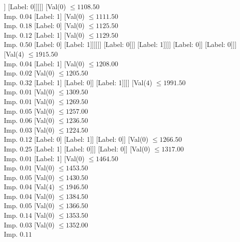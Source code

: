 \documentclass[margin=10pt]{standalone}
\begin{document}
\begin{forest}
																				[Label: 0]
																				[Label: 1]]
																			[Label: 0]]]]]
															[Val($0$) $ \leq 1108.50$ \\ Imp. $0.04$
																[Label: 1]
																[Val($0$) $ \leq 1111.50$ \\ Imp. $0.18$
																	[Label: 0]
																	[Val($0$) $ \leq 1125.50$ \\ Imp. $0.12$
																		[Label: 1]
																		[Val($0$) $ \leq 1129.50$ \\ Imp. $0.50$
																			[Label: 0]
																			[Label: 1]]]]]]
														[Label: 0]]]
												[Label: 1]]]]
									[Label: 0]]
								[Label: 0]]]
						[Val($4$) $ \leq 1915.50$ \\ Imp. $0.04$
							[Label: 1]
							[Val($0$) $ \leq 1208.00$ \\ Imp. $0.02$
								[Val($0$) $ \leq 1205.50$ \\ Imp. $0.32$
									[Label: 1]
									[Label: 0]]
								[Label: 1]]]]
					[Val($4$) $ \leq 1991.50$ \\ Imp. $0.01$
						[Val($0$) $ \leq 1309.50$ \\ Imp. $0.01$
							[Val($0$) $ \leq 1269.50$ \\ Imp. $0.05$
								[Val($0$) $ \leq 1257.00$ \\ Imp. $0.06$
									[Val($0$) $ \leq 1236.50$ \\ Imp. $0.03$
										[Val($0$) $ \leq 1224.50$ \\ Imp. $0.12$
											[Label: 0]
											[Label: 1]]
										[Label: 0]]
									[Val($0$) $ \leq 1266.50$ \\ Imp. $0.25$
										[Label: 1]
										[Label: 0]]]
								[Label: 0]]
							[Val($0$) $ \leq 1317.00$ \\ Imp. $0.01$
								[Label: 1]
								[Val($0$) $ \leq 1464.50$ \\ Imp. $0.01$
									[Val($0$) $ \leq 1453.50$ \\ Imp. $0.05$
										[Val($0$) $ \leq 1430.50$ \\ Imp. $0.04$
											[Val($4$) $ \leq 1946.50$ \\ Imp. $0.04$
												[Val($0$) $ \leq 1384.50$ \\ Imp. $0.05$
													[Val($0$) $ \leq 1366.50$ \\ Imp. $0.14$
														[Val($0$) $ \leq 1353.50$ \\ Imp. $0.03$
															[Val($0$) $ \leq 1352.00$ \\ Imp. $0.11$

\end{forest}
\end{document}
